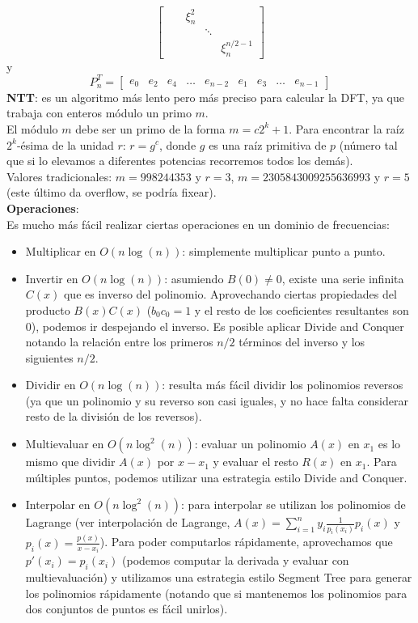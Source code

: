 {\[\begin{bmatrix}
        & & \xi_n^2 \\
        & & & \ddots \\
        & & & & \xi_n^{n/2-1}
    \end{bmatrix}
\]
    y
\[
    P_n^T = 
    \begin{bmatrix}
        e_0 & e_2 & e_4 & \ldots & e_{n-2} & e_1 & e_3 & \ldots & e_{n-1}
    \end{bmatrix}
\]  
\textbf{NTT}: es un algoritmo más lento pero más preciso para calcular la DFT,
ya que trabaja con enteros módulo un primo $m$. \\
El módulo $m$ debe ser un primo de la forma $m = c2^k + 1$.
Para encontrar la raíz $2^k$-ésima de la unidad $r$: $r = g ^ c$, donde $g$ es una raíz primitiva de $p$ (número tal que si lo elevamos a diferentes potencias recorremos todos los demás). \\
Valores tradicionales: $m = 998244353$ y $r = 3$, $m = 2305843009255636993$ y $r = 5$ (este último da overflow, se podría fixear). \\

\textbf{Operaciones}: \\
Es mucho más fácil realizar ciertas operaciones en un dominio de frecuencias:
\begin{itemize}
	\item Multiplicar en $O(n\log(n))$: simplemente multiplicar punto a punto.

    \item Invertir en $O(n\log(n))$: asumiendo $B(0) \neq 0$, existe una serie infinita $C(x)$ que es inverso del polinomio.
    Aprovechando ciertas propiedades del producto $B(x)C(x)$ ($b_0c_0 = 1$ y el resto de los coeficientes resultantes son $0$),
    podemos ir despejando el inverso. Es posible aplicar Divide and Conquer notando la relación entre los primeros $n/2$ términos
    del inverso y los siguientes $n/2$.

	\item Dividir en $O(n\log(n))$: resulta más fácil dividir los polinomios reversos (ya que un polinomio y su reverso son casi iguales,
	y no hace falta considerar resto de la división de los reversos).
	
    \item Multievaluar en $O(n\log^2(n))$: evaluar un polinomio $A(x)$ en $x_1$ es lo mismo que dividir $A(x)$ por $x - x_1$ y evaluar el resto
    $R(x)$ en $x_1$. Para múltiples puntos, podemos utilizar una estrategia estilo Divide and Conquer.

    \item Interpolar en $O(n\log^2(n))$: para interpolar se utilizan los polinomios de Lagrange (ver interpolación de Lagrange, 
    $A(x)=\sum_{i=1}^{n} y_i\frac{1}{p_i(x_i)}p_i(x)$ y $p_i(x) = \frac{p(x)}{x-x_i}$). Para poder computarlos rápidamente, aprovechamos que
    $p'(x_i)=p_i(x_i)$ (podemos computar la derivada y evaluar con multievaluación) y utilizamos una estrategia estilo Segment Tree para
    generar los polinomios rápidamente (notando que si mantenemos los polinomios para dos conjuntos de puntos es fácil unirlos).


\end{itemize}}
